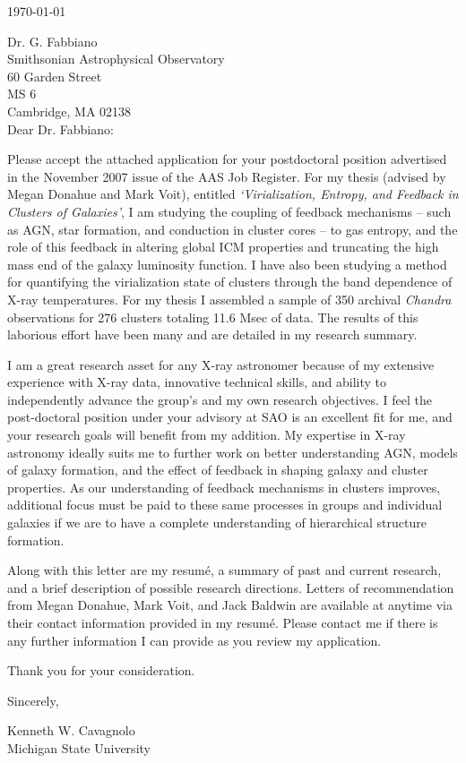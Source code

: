 \documentclass[11pt]{article}
\begin{document}
\today

Dr. G. Fabbiano\\
Smithsonian Astrophysical Observatory\\
60 Garden Street\\
MS 6\\
Cambridge, MA 02138\\

Dear Dr. Fabbiano:

Please accept the attached application for your postdoctoral
position advertised in the November 2007 issue of the AAS Job
Register. For my thesis (advised by Megan Donahue and  Mark Voit),
entitled {\it `Virialization, Entropy, and Feedback in Clusters of
Galaxies'}, I am studying the coupling of feedback mechanisms -- such
as AGN, star formation, and conduction in cluster cores -- to gas
entropy, and the role of this feedback in altering global ICM
properties and truncating the high mass end of the galaxy luminosity
function. I have also been studying a method for quantifying the
virialization state of clusters through the band dependence of X-ray
temperatures. For my thesis I assembled a sample of 350 archival
{\textit{Chandra}} observations for 276 clusters totaling 11.6 Msec of
data. The results of this laborious effort have been many and are
detailed in my research summary.

I am a great research asset for any X-ray astronomer because of my
extensive experience with X-ray data, innovative technical skills, and
ability to independently advance the group's and my own research
objectives. I feel the post-doctoral position under your advisory at
SAO is an excellent fit for me, and your research goals will benefit
from my addition. My expertise in X-ray astronomy ideally suits me to
further work on better understanding AGN, models of galaxy formation,
and the effect of feedback in shaping galaxy and cluster
properties. As our understanding of feedback mechanisms in clusters
improves, additional focus must be paid to these same processes in
groups and individual galaxies if we are to have a complete
understanding of hierarchical structure formation.

Along with this letter are my resum\'{e}, a summary of past and
current research, and a brief description of possible research
directions. Letters of recommendation from Megan Donahue, Mark Voit,
and Jack Baldwin are available at anytime via their contact
information provided in my resum\'{e}. Please contact me if there is
any further information I can provide as you review my application.

Thank you for your consideration.

Sincerely,\\
\begin{minipage}{7.5in}
\end{minipage}
Kenneth W. Cavagnolo\\
Michigan State University
\end{document}
